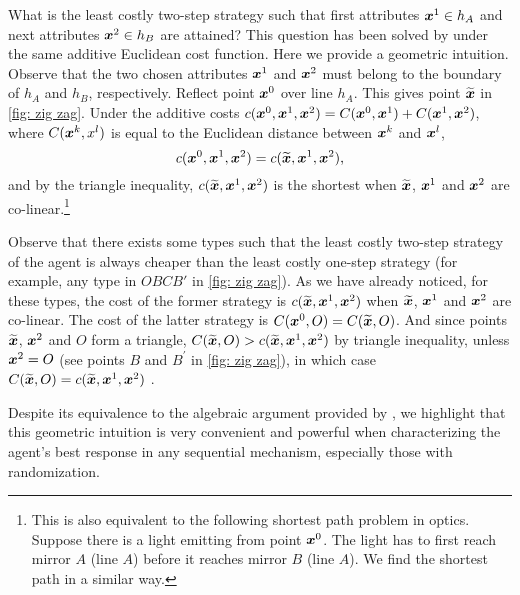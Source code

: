 What is the least costly two-step strategy such that first attributes $%
\firstfeatures\in h_{A}$ and next attributes $\boldsymbol{x}^2\in h_{B}$ are attained? This question has been solved by \citet{zigzag} under the same additive Euclidean cost function.  Here we provide a geometric intuition. Observe that
the two chosen attributes $\boldsymbol{x}^1$ and $\boldsymbol{x}^2$ must belong to the boundary of $%
h_{A}$ and $h_{B}$, respectively. Reflect point $\boldsymbol{x}^0$ over line $h_{A}$.
This gives point $\widetilde{\boldsymbol{x}}$ in \cref{fig: zig zag}. Under the additive costs $%
\cost(\orifeatures,\firstfeatures,\secondfeatures)=\onecost(\orifeatures,\firstfeatures)+\onecost(\firstfeatures,\secondfeatures)$, where $C(\boldsymbol{x}^{k},x^{l})$
is equal to the Euclidean distance between $\boldsymbol{x}^{k}$ and $\boldsymbol{x}^{l}$, 
\[
c(\boldsymbol{x}^0,\boldsymbol{x}^1,\boldsymbol{x}^2)=c(\widetilde{\boldsymbol{x}},\boldsymbol{x}^1,\boldsymbol{x}^2)\text{,}
\]%
and by the triangle inequality, $c(\widetilde{\boldsymbol{x}},\boldsymbol{x}^1,\boldsymbol{x}^2)$ is the
shortest when $\widetilde{\boldsymbol{x}}$, $\boldsymbol{x}^1$ and $\boldsymbol{x}^2$ are co-linear.\footnote{This is also equivalent to the following shortest path problem in optics.
Suppose there is a light emitting from point $\boldsymbol{x}^0$.
The light has to first reach mirror $A$ (line $A$) before it reaches mirror $B$ (line $A$). We find the shortest path in a similar way.}

Observe that 
there exists some types such that the least costly two-step strategy of the agent is always cheaper than the
least costly one-step strategy (for example, any type in $OBCB'$ in \cref{fig: zig zag}). As we have already noticed, for these types, the cost of the
former strategy is $c(\widetilde{\boldsymbol{x}},\boldsymbol{x}^1,\boldsymbol{x}^2)$ when $\widetilde{\boldsymbol{x}}$, $%
\firstfeatures$ and $\boldsymbol{x}^2$ are co-linear. The cost of the latter strategy is $%
\onecost(\orifeatures,O)=\onecost(\widetilde{\features},O)$. And since points $\widetilde{\boldsymbol{x}}$, $\boldsymbol{x}^2$
and $O$ form a triangle, $C(\widetilde{\boldsymbol{x}},O)>c(\widetilde{\boldsymbol{x}},\boldsymbol{x}^1,\boldsymbol{x}^2)$
by triangle inequality, unless $\boldsymbol{x}^2=O$ (see points $B$ and $B^{\prime }$
in \cref{fig: zig zag}), in which case $C(\widetilde{\boldsymbol{x}},O)=c(\widetilde{\boldsymbol{x}},\boldsymbol{x}^1,\boldsymbol{x}^2)$%
.

Despite its equivalence to the algebraic argument provided by \citet{zigzag}, we  highlight that this geometric intuition is very convenient and powerful when characterizing the agent's best response in any sequential mechanism, especially those with randomization.